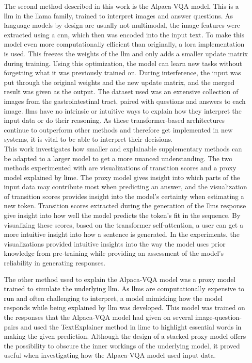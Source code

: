     The second method described in this work is the Alpaca-VQA model. This is a \gls{llm} in the \gls{llama} family, trained to interpret images and answer questions. As language models by design are usually not multimodal, the image features were extracted using a \gls{cnn}, which then was encoded into the input text. To make this model even more computationally efficient than originally, a \gls{lora} implementation is used. This freezes the weights of the \gls{llm} and only adds a smaller update matrix during training. Using this optimization, the model can learn new tasks without forgetting what it was previously trained on. During interference, the input was put through the original weights and the new update matrix, and the merged result was given as the output. The dataset used was an extensive collection of images from the gastrointestinal tract, paired with questions and answers to each image. 
    \glspl{llm} have no intrinsic or intuitive ways to explain how they interpret the input data or do their reasoning. As these transformer-based architectures continue to outperform other methods and therefore get implemented in new systems, it is vital to be able to interpret their decisions.\\
    
    
    This work investigates how smaller and explainable supplementary methods can be adapted to a larger model to get a more nuanced understanding. 
    The two methods experimented with are visualizations of transition scores and a proxy model explained by \gls{lime}. The proxy model gives insight into which parts of the input data may contribute most when predicting an answer, and the visualization of transition scores provides insight into the model's certainty when estimating a new token. 
    Transition scores extracted during the generation of the \gls{llm}s response give insight into how well the model predicts the token's fit in the sequence. By visualizing these scores, based on the transformer self-attention, a user can get a more intuitive insight into how a sentence is generated. In the experiments, the visualizations provided intuitive insights into the way the model uses prior knowledge from pre-training while providing an assessment of the model's reliability in generating responses.
    
    The other method used to explain the Alpaca-VQA model was a proxy model trained to simulate the underlying \gls{llm}. As \glspl{llm} are computationally expensive to run and often challenging to interpret, a model mimicking how the model responds while being explained by \gls{llm} was developed. This model was trained on the responses that the Alpaca-VQA model had given on several image-question-pairs and used the TextExplainer method in \gls{lime} to highlight essential words in making the given prediction. Although the design of a stacked proxy model offers the possibility to obscure the inner workings of the underlying model, it proved useful when investigating how the Alpaca-VQA model used input data.

